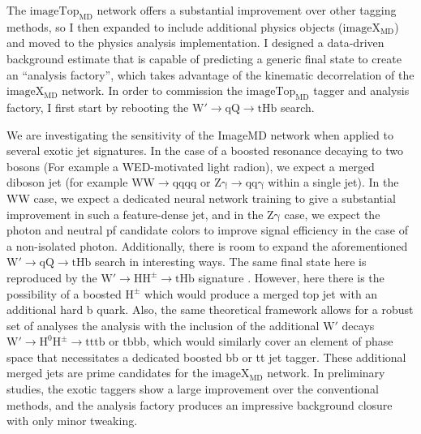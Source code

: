 \documentclass[12pt]{article}
\begin{document}
The $\mathrm{imageTop_{MD}}$ network offers a substantial improvement over other tagging
methods, so I then expanded to include additional physics objects ($\mathrm{imageX_{MD}}$) and
moved to the physics analysis implementation.  I designed a data-driven background estimate
that is capable of predicting a generic final state to create an ``analysis factory'',
which takes advantage of the kinematic decorrelation of the $\mathrm{imageX_{MD}}$ network.  In order
to commission the $\mathrm{imageTop_{MD}}$ tagger and analysis factory, I first start by rebooting
the $\mathrm{W' \to qQ \to tHb}$ search.

We are investigating the sensitivity of the ImageMD network when applied to several
exotic jet signatures.  In the case of a boosted resonance decaying to two bosons (For example a WED-motivated light radion),
we expect a merged diboson jet (for example $\mathrm{WW \to qqqq}$ or $\mathrm{Z\gamma \to qq\gamma}$ within a single jet).
In the WW case, we expect a dedicated neural network training to give a substantial improvement in
such a feature-dense jet, and in the $\mathrm{Z\gamma}$ case, we expect the photon and neutral pf
candidate colors to improve signal efficiency in the case of a non-isolated
photon.  Additionally, there is room to expand the aforementioned
$\mathrm{W' \to qQ \to tHb}$ search in interesting ways.  The same final state here is
reproduced by the $\mathrm{W' \to HH^{\pm} \to tHb}$ signature \cite{Dobrescu:2015yba}.
However, here there is the possibility of a boosted $\mathrm{H^{\pm}}$ which would produce a
merged top jet with an additional hard b quark.
Also, the same theoretical framework allows for a robust set of analyses the
analysis with the inclusion of the additional $\mathrm{W'}$ decays
$\mathrm{W' \to H^{0}H^{\pm} \to tttb}$ or $\mathrm{tbbb}$, which would similarly cover an element of phase space
that necessitates a dedicated boosted bb or tt jet tagger.
These additional merged jets are prime candidates for the $\mathrm{imageX_{MD}}$
network.  In preliminary studies, the exotic taggers show a large improvement over the
conventional methods, and the analysis factory produces an impressive background
closure with only minor tweaking.
\end{document}

